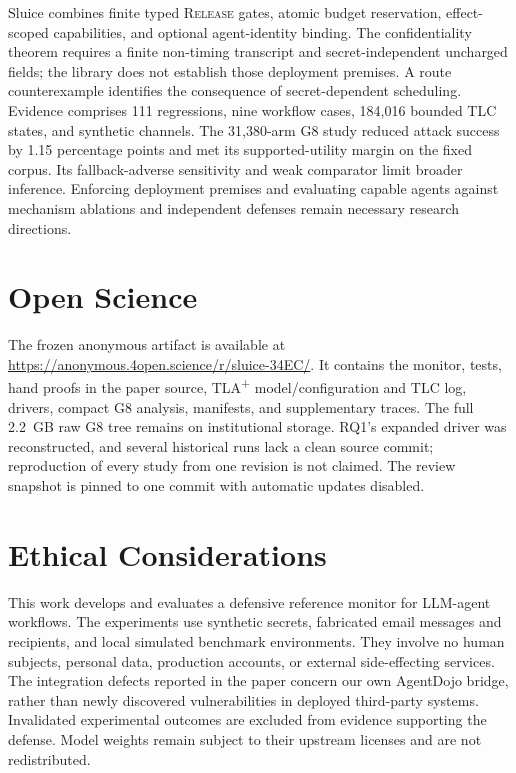\documentclass[conference,compsoc]{IEEEtran}
\newif\ifcamera\camerafalse %
\newcommand{\sys}{Sluice}
\begin{document}
\sys{} combines finite typed \textsc{Release} gates, atomic budget reservation, effect-scoped capabilities, and optional agent-identity binding. The confidentiality theorem requires a finite non-timing transcript and secret-independent uncharged fields; the library does not establish those deployment premises. A route counterexample identifies the consequence of secret-dependent scheduling. Evidence comprises 111 regressions, nine workflow cases, 184{,}016 bounded TLC states, and synthetic channels. The 31{,}380-arm G8 study reduced attack success by 1.15 percentage points and met its supported-utility margin on the fixed corpus. Its fallback-adverse sensitivity and weak comparator limit broader inference. Enforcing deployment premises and evaluating capable agents against mechanism ablations and independent defenses remain necessary research directions.

\section*{Open Science}
The frozen anonymous artifact is available at \url{https://anonymous.4open.science/r/sluice-34EC/}. It contains the monitor, tests, hand proofs in the paper source, TLA\textsuperscript{+} model/configuration and TLC log, drivers, compact G8 analysis, manifests, and supplementary traces. The full 2.2~GB raw G8 tree remains on institutional storage. RQ1's expanded driver was reconstructed, and several historical runs lack a clean source commit; reproduction of every study from one revision is not claimed. The review snapshot is pinned to one commit with automatic updates disabled.

\ifcamera
\section*{Ethical Considerations}
This work develops and evaluates a defensive reference monitor for LLM-agent workflows. The experiments use synthetic secrets, fabricated email messages and recipients, and local simulated benchmark environments. They involve no human subjects, personal data, production accounts, or external side-effecting services. The integration defects reported in the paper concern our own AgentDojo bridge, rather than newly discovered vulnerabilities in deployed third-party systems. Invalidated experimental outcomes are excluded from evidence supporting the defense. Model weights remain subject to their upstream licenses and are not redistributed.
\end{document}
